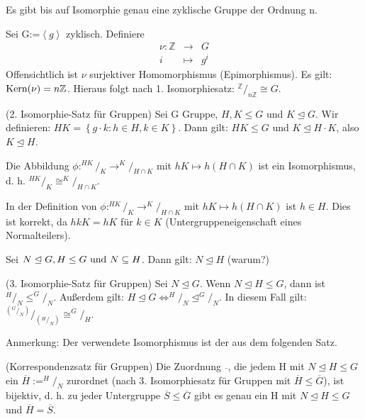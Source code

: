 \documentclass[10pt]{scrbook}
\begin{document}
\begin{Le}
Es gibt bis auf Isomorphie genau eine zyklische Gruppe der Ordnung n.
\end{Le}
\begin{bew}
Sei G:=$\left\langle g\right\rangle$ zyklisch. Definiere
\begin{eqnarray*}
	\nu: \mathbb{Z} & \rightarrow & G\\
	i & \mapsto & g^i
\end{eqnarray*}
Offensichtlich ist $\nu$ surjektiver Homomorphismus (Epimorphismus). Es gilt: $\operatorname{Kern}(\nu)=n\mathbb{Z}$. Hieraus folgt nach 1. Isomorphiesatz: $^\mathbb{Z}/_{n\mathbb{Z}}\cong G$.
\end{bew}

\begin{Sa}
(2. Isomorphie-Satz für Gruppen)
Sei G Gruppe, $H, K\leq G$ und $K\trianglelefteq G$. Wir definieren: $H K=\left\{g\cdot k: h\in H, k\in K\right\}$. Dann gilt: $H K\leq G$ und $K\trianglelefteq H\cdot K$, also $K\trianglelefteq H$.

Die Abbildung $\phi: ^{H K}/_K \rightarrow ^K/_{H\cap K}$ mit $h K\mapsto h (H\cap K)$ ist ein Isomorphismus, d. h. $^{H K}/_K\cong ^K/_{H\cap K}$. 
\end{Sa}

\begin{Bem}
In der Definition von $\phi: ^{H K}/_K \rightarrow ^K/_{H\cap K}$ mit $h K\mapsto h (H\cap K)$ ist $h\in H$. Dies ist korrekt, da $h k K=h K$ für $k\in K$ (Untergruppeneigenschaft eines Normalteilers).
\end{Bem}

\begin{Bem}
Sei $N\trianglelefteq G, H\leq G\textnormal{ und }N\subseteq H$. Dann gilt: $N\trianglelefteq H$ (warum?)
\end{Bem}

\begin{Sa}
(3. Isomorphie-Satz für Gruppen)
Sei $N\trianglelefteq G$. Wenn $N\trianglelefteq H\leq G$, dann ist $^H/_N\leq ^G/_N$. Außerdem gilt: $H \trianglelefteq G\Leftrightarrow ^H/_N\trianglelefteq ^G/_N$. In diesem Fall gilt: $^{\left(^G/_N\right)}/_{\left(^H/_N\right)}\cong ^G/_H$.
\end{Sa}
\begin{bew}
Anmerkung: Der verwendete Isomorphismus ist der aus dem folgenden Satz.
\end{bew}

\begin{Sa}
(Korrespondenzsatz für Gruppen)
Die Zuordnung $\overline{\ }$, die jedem H mit $N\trianglelefteq H\leq G$ ein $\overline{H}:=^H/_N$ zurordnet (nach 3. Isomorphiesatz für Gruppen mit $\overline{H}\leq \overline{G}$), ist bijektiv, d. h. zu jeder Untergruppe $\overline{S}\leq \overline{G}$ gibt es genau ein H mit $N\trianglelefteq H\leq G$ und $\overline{H}=\overline{S}$.
\end{Sa}
\end{document}
